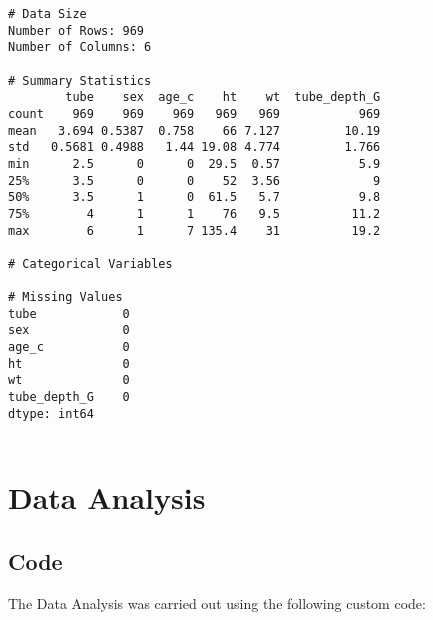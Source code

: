 \documentclass[11pt]{article}
\begin{document}
\begin{Verbatim}[tabsize=4]
# Data Size
Number of Rows: 969
Number of Columns: 6

# Summary Statistics
        tube    sex  age_c    ht    wt  tube_depth_G
count    969    969    969   969   969           969
mean   3.694 0.5387  0.758    66 7.127         10.19
std   0.5681 0.4988   1.44 19.08 4.774         1.766
min      2.5      0      0  29.5  0.57           5.9
25%      3.5      0      0    52  3.56             9
50%      3.5      1      0  61.5   5.7           9.8
75%        4      1      1    76   9.5          11.2
max        6      1      7 135.4    31          19.2

# Categorical Variables

# Missing Values
tube            0
sex             0
age_c           0
ht              0
wt              0
tube_depth_G    0
dtype: int64


\end{Verbatim}

\section{Data Analysis}
\subsection{{Code}}
The Data Analysis was carried out using the following custom code:
\end{document}
